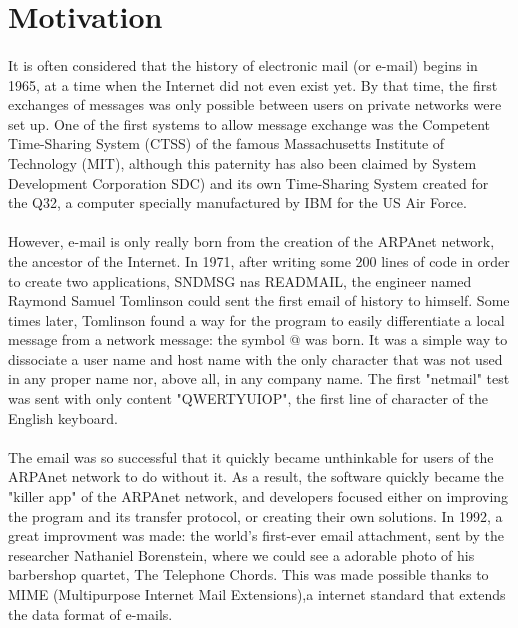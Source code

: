 
\section{Motivation}
\paragraph{}
It is often considered that the history of electronic mail (or e-mail) begins in 1965, at a time when the Internet did not even exist yet. By that time, the first exchanges of messages was only possible between users on private networks were set up. One of the first systems to allow message exchange was the Competent Time-Sharing System (CTSS) of the famous Massachusetts Institute of Technology (MIT), although this paternity has also been claimed by System Development Corporation SDC) and its own Time-Sharing System created for the Q32, a computer specially manufactured by IBM for the US Air Force.
\paragraph{}
However, e-mail is only really born from the creation of the ARPAnet network, the ancestor of the Internet. In 1971, after writing some 200 lines of code in order to create two applications, SNDMSG nas READMAIL, the engineer named Raymond Samuel Tomlinson could sent the first email of history to himself. Some times later, 
Tomlinson found a way for the program to easily differentiate a local message from a network message: the symbol @ was born. It was a simple way to ​​dissociate a user name and host name with the only character that was not used in any proper name nor, above all, in any company name. The first "netmail" test was sent with only content "QWERTYUIOP", the first line of character of the English keyboard.
\paragraph{}
The email was so successful that it quickly became unthinkable for users of the ARPAnet network to do without it. As a result, the software quickly became the "killer app"  of the ARPAnet network, and developers focused either on improving the program and its transfer protocol, or creating their own solutions. In 1992, a great improvment was made: the world's first-ever email attachment, sent by the researcher Nathaniel Borenstein, where we could see a adorable photo of his barbershop quartet, The Telephone Chords. This was made possible thanks to MIME (Multipurpose Internet Mail Extensions),a internet standard that extends the data format of e-mails.
